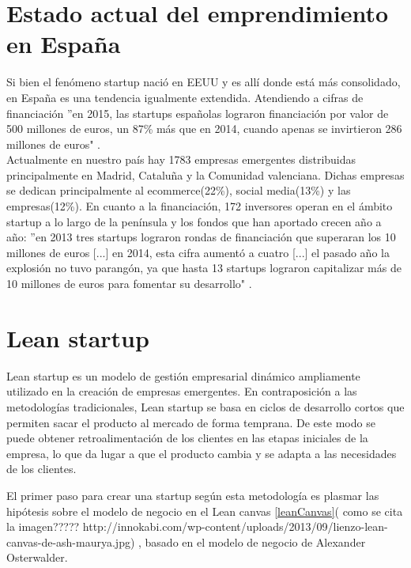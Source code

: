 \section{Estado actual del emprendimiento en España}

Si bien el fenómeno startup nació en EEUU y es allí donde está más consolidado, en España es una tendencia igualmente extendida. Atendiendo a cifras de financiación ''en 2015, las startups españolas lograron financiación por valor de 500 millones de euros, un 87\%   más que en 2014, cuando apenas se invirtieron 286 millones de euros" \cite{albertoiglesiasfraga2016}.\\
Actualmente en nuestro país hay 1783 empresas emergentes distribuidas principalmente en Madrid, Cataluña y la Comunidad valenciana. Dichas empresas se dedican principalmente al ecommerce(22\%), social media(13\%) y las empresas(12\%). En cuanto a la financiación, 172 inversores operan en el ámbito startup a lo largo de la península \cite{startupxplore2017} y los fondos que han aportado crecen año a año: ''en 2013 tres startups lograron rondas de financiación que superaran los 10 millones de euros [...] en 2014, esta cifra aumentó a cuatro [...] el pasado año la explosión no tuvo parangón, ya que hasta 13 startups lograron capitalizar más de 10 millones de euros para fomentar su desarrollo" \cite{albertoiglesiasfraga2016}. 

\section{Lean startup}

Lean startup es un modelo de gestión empresarial dinámico ampliamente utilizado en la creación de empresas emergentes. En contraposición a las metodologías tradicionales, Lean startup se basa en ciclos de desarrollo cortos que permiten sacar el producto al mercado de forma temprana. De este modo se puede obtener retroalimentación de los clientes en las etapas iniciales de la empresa, lo que da lugar a que el producto cambia y se adapta a las necesidades de los clientes.

El primer paso para crear una startup según esta metodología es plasmar las hipótesis sobre el modelo de negocio en el Lean canvas \ref{leanCanvas}( como se cita la imagen????? http://innokabi.com/wp-content/uploads/2013/09/lienzo-lean-canvas-de-ash-maurya.jpg) , basado en el modelo de negocio de Alexander Osterwalder.\\


